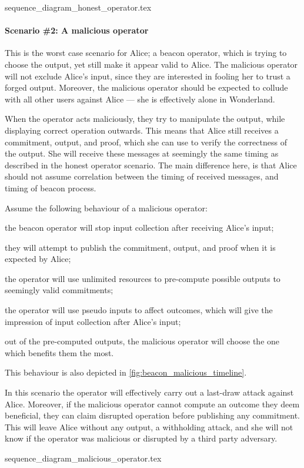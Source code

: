 {sequence_diagram_honest_operator.tex}

\paragraph{Scenario \#2: A malicious operator}
This is the worst case scenario for Alice; a beacon operator, which is trying to choose the output, yet still make it appear valid to Alice.
The malicious operator will not exclude Alice's input, since they are interested in fooling her to trust a forged output.
Moreover, the malicious operator should be expected to collude with all other users against Alice --- she is effectively alone in Wonderland.

When the operator acts maliciously, they try to manipulate the output, while displaying correct operation outwards.
This means that Alice still receives a commitment, output, and proof, which she can use to verify the correctness of the output.
She will receive these messages at seemingly the same timing as described in the honest operator scenario.
The main difference here, is that Alice should not assume correlation between the timing of received messages, and timing of beacon process.

Assume the following behaviour of a malicious operator:
\begin{eletterate*}
\item the beacon operator will stop input collection after receiving Alice's input;
\item they will attempt to publish the commitment, output, and proof when it is expected by Alice;
\item the operator will use unlimited resources to pre-compute possible outputs to seemingly valid commitments;
\item the operator will use pseudo inputs to affect outcomes, which will give the impression of input collection after Alice's input;
\item out of the pre-computed outputs, the malicious operator will choose the one which benefits them the most.
\end{eletterate*}
This behaviour is also depicted in \cref{fig:beacon_malicious_timeline}.

In this scenario the operator will effectively carry out a last-draw attack against Alice.
Moreover, if the malicious operator cannot compute an outcome they deem beneficial, they can claim disrupted operation before publishing any commitment.
This will leave Alice without any output, a withholding attack, and she will not know if the operator was malicious or disrupted by a third party adversary.

{sequence_diagram_malicious_operator.tex}

